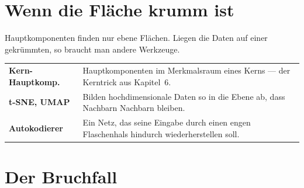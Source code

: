 \section{Wenn die Fläche krumm ist}

\begin{merksatz}
Hauptkomponenten finden nur ebene Flächen. Liegen die Daten auf einer gekrümmten, so braucht man andere Werkzeuge.

\begin{center}
{\small
\renewcommand{\arraystretch}{1.55}
\begin{tabular}{@{}P{2.8cm}P{5.8cm}@{}}
\toprule
\textbf{Kern-Hauptkomp.} & Hauptkomponenten im Merkmalsraum eines Kerns --- der Kerntrick aus Kapitel~6.\\
\textbf{t-SNE, UMAP} & Bilden hochdimensionale Daten so in die Ebene ab, dass Nachbarn Nachbarn bleiben.\\
\textbf{Autokodierer} & Ein Netz, das seine Eingabe durch einen engen Flaschenhals hindurch wiederherstellen soll.\\
\bottomrule
\end{tabular}}
\end{center}

\begin{center}
\begin{minipage}{0.88\textwidth}
\end{minipage}
\end{center}
\end{merksatz}

\section{Der Bruchfall}

